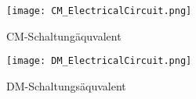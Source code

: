 \begin{figure}[H]
	\centering
	\texttt{[image: CM\_ElectricalCircuit.png]}
	\caption{CM-Schaltungäquvalent \cite{aufgabenstellung}}
	\label{fig:CM-Schaltungäquivalent}
\end{figure}

\begin{figure}[H]
	\centering
	\texttt{[image: DM\_ElectricalCircuit.png]}
	\caption{DM-Schaltungsäquvalent \cite{aufgabenstellung}}
	\label{fig:DM-Schaltungsäquivalent}
\end{figure}
\newpage

